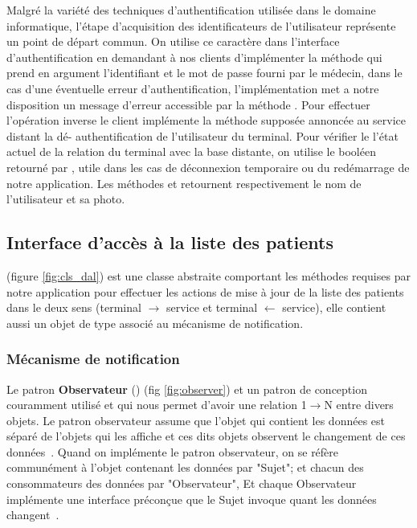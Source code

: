 Malgré la variété des techniques d'authentification utilisée dans le domaine
informatique, l'étape d'acquisition des identificateurs de l'utilisateur
représente un point de départ commun. On utilise ce caractère dans l'interface
d'authentification en demandant à nos clients d'implémenter la méthode
 qui prend en argument l'identifiant et le mot de passe fourni par
le médecin, dans le cas d'une éventuelle erreur d'authentification,
l’implémentation met a notre disposition un message d'erreur accessible par la
méthode . Pour effectuer l’opération inverse le client
implémente la méthode  supposée annoncée au service distant la dé-
authentification de l'utilisateur du terminal. Pour vérifier le l'état actuel de
la relation du terminal avec la base distante, on utilise le booléen retourné
par , utile dans les cas de déconnexion temporaire ou du
redémarrage de notre application. Les méthodes  et
 retournent respectivement le nom de l'utilisateur et sa photo.

\subsection{Interface d’accès à la liste des patients}

 (figure \ref{fig:cls_dal}) est une classe abstraite comportant les
méthodes requises par notre application pour effectuer les actions de mise à
jour de la liste des patients dans le deux sens (terminal $\rightarrow$ service
et terminal $\leftarrow$ service), elle contient aussi un objet de type
 associé au mécanisme de notification.

\subsubsection{Mécanisme de notification}

Le patron \textbf{Observateur} () (fig
\ref{fig:observer}) et un patron de conception couramment utilisé et qui
nous permet d'avoir une relation 1$\rightarrow$N entre divers objets. Le
patron observateur assume que l'objet qui contient les données est
séparé de l'objets qui les affiche et ces dits objets observent le
changement de ces données~\cite{jdp_observer}. Quand on implémente le
patron observateur, on se réfère communément à l'objet contenant les
données par "Sujet"; et chacun des consommateurs des données par
"Observateur", Et chaque Observateur implémente une interface préconçue
que le Sujet invoque quant les données changent~\cite{jdp_observer}.


